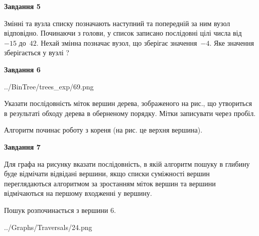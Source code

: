 \documentclass[12pt, ukrainian]{article}
\begin{document}
{\begin {large}
{\begin {center}\textbf{Завдання 5}\end {center}}\par
Змінні  та  вузла списку позначають наступний та попередній за ним вузол відповідно. Починаючи з голови, у список записано послідовні цілі числа від~$-15$ до~$42$. Нехай змінна  позначає вузол, що зберігає значення~$-4$.
Яке значення зберігається у вузлі  ?\par
\newpage

{\begin {center}\textbf{Завдання 6}\end {center}}\par

\begin{center}
	{../BinTree/trees_exp/69.png}
\end{center}
Указати послідовність міток вершин дерева, зображеного на рис., що утвориться в результаті обходу дерева в оберненому порядку. Мітки записувати через пробіл.\par Алгоритм починає роботу з кореня (на рис. це верхня вершина).\par
\newpage

{\begin {center}\textbf{Завдання 7}\end {center}}\par
Для графа на рисунку вказати послідовність, в якій алгоритм пошуку в глибину буде відмічати відвідані вершини, якщо списки суміжності вершин переглядаються алгоритмом за зростанням міток вершин та вершини відмічаються на першому вход\-женні у вершину.\par
Пошук розпочинається з вершини 6.\par

\begin{center}
	{../Graphs/Traversals/24.png}
\end{center}\par
\newpage


\end{large}}
\end{document}

